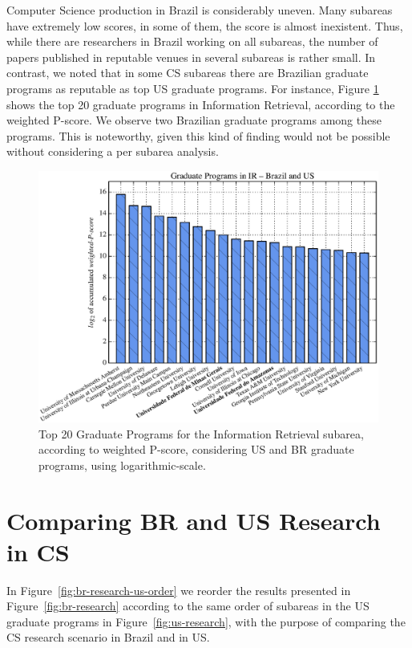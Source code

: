 \documentclass[msc]{ppgccufmg}
\begin{document}
Computer Science production in Brazil is considerably uneven. Many subareas have extremely low scores, in some of them, the score is almost inexistent.
%
Thus, while there are researchers in Brazil working on all subareas, the number of papers published in reputable venues in several subareas is rather small. 
%
In contrast, we noted that in some CS subareas there are Brazilian graduate programs as reputable as top US graduate programs. For instance, Figure \ref{fig:ranking-ir} shows the top 20 graduate programs in Information Retrieval, according to the weighted P-score. We observe two Brazilian graduate programs among these programs. This is noteworthy, given this kind of finding would not be possible without considering a per subarea analysis.

\begin{figure}[htbp]
     \includegraphics[width=\linewidth]{fig/ir_groups.eps}
    \caption{Top 20 Graduate Programs for the Information Retrieval subarea, according to weighted P-score, considering US and BR graduate programs, using logarithmic-scale.}
    \label{fig:ranking-ir}
\end{figure}

\section{Comparing BR and US Research in CS}\label{sec:comparison}

In Figure~\ref{fig:br-research-us-order} we reorder the results presented in Figure~\ref{fig:br-research} according to the same order of subareas in the US graduate programs in Figure~\ref{fig:us-research}, with the purpose of comparing the CS research scenario in Brazil and in US.
\end{document}
